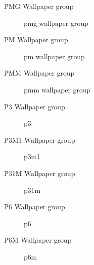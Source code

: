 \documentclass{beamer}
\theoremstyle{definition}
\begin{document}
\begin{frame}{PMG Wallpaper group}
    \begin{figure}
        \centering
        
        \caption{pmg wallpaper group}
        \label{fig:pmg}
    \end{figure}
\end{frame}

\begin{frame}{PM Wallpaper group}
    \begin{figure}
        \centering
        
        \caption{pm wallpaper group}
        \label{fig:pmm}
    \end{figure}
\end{frame}

\begin{frame}{PMM Wallpaper group}
    \begin{figure}
        \centering
        
        \caption{pmm wallpaper group}
        \label{fig:pmm}
    \end{figure}
\end{frame}

\begin{frame}{P3 Wallpaper group}
    \begin{figure}
        \centering
        
        \caption{p3}
        \label{fig:p3}
    \end{figure}
\end{frame}

\begin{frame}{P3M1 Wallpaper group}
    \begin{figure}
        \centering
        
        \caption{p3m1}
        \label{fig:p3m1}
    \end{figure}
\end{frame}

\begin{frame}{P31M Wallpaper group}
    \begin{figure}
        \centering
        
        \caption{p31m}
        \label{fig:p31m}
    \end{figure}
\end{frame}

\begin{frame}{P6 Wallpaper group}
    \begin{figure}
        \centering
        
        \caption{p6}
        \label{fig:p3}
    \end{figure}
\end{frame}

\begin{frame}{P6M Wallpaper group}
    \begin{figure}
        \centering
        
        \caption{p6m}
        \label{fig:p3m}
    \end{figure}
\end{frame}
\end{document}
